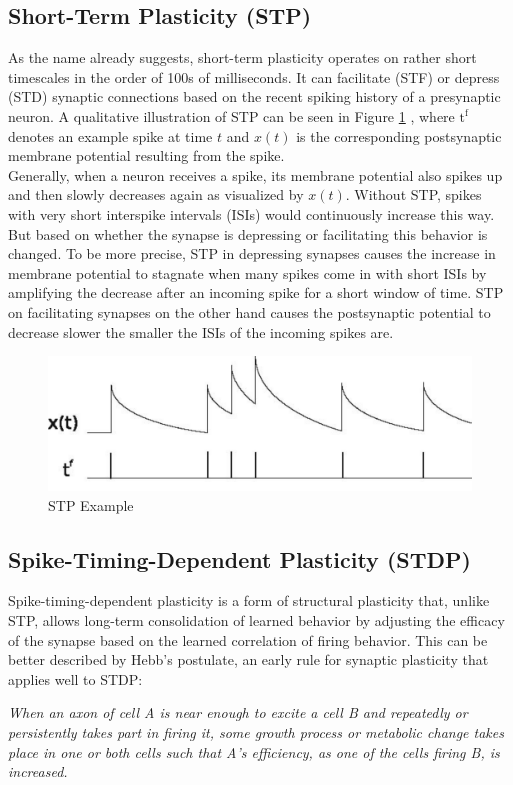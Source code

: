 \subsection{Short-Term Plasticity (STP)} \label{ssec:short_term_plasticity}
As the name already suggests, short-term plasticity operates on rather short timescales in the order of 100s of milliseconds. It can facilitate (STF) or depress (STD) synaptic connections based on the recent spiking history of a presynaptic neuron. A qualitative illustration of STP can be seen in Figure \ref{fig:stp_example} \parencite{morrison_diesmann_gerstner_2008}, where $\text{t}^\text{f}$ denotes an example spike at time $t$ and $x(t)$ is the corresponding postsynaptic membrane potential resulting from the spike.\\
Generally, when a neuron receives a spike, its membrane potential also spikes up and then slowly decreases again as visualized by $x(t)$. Without STP, spikes with very short interspike intervals (ISIs) would continuously increase this way. But based on whether the synapse is depressing or facilitating this behavior is changed. To be more precise, STP in depressing synapses causes the increase in membrane potential to stagnate when many spikes come in with short ISIs by amplifying the decrease after an incoming spike for a short window of time. STP on facilitating synapses on the other hand causes the postsynaptic potential to decrease slower the smaller the ISIs of the incoming spikes are.

\begin{figure}[htbp]
    \centering
    \includegraphics[width=0.9\columnwidth]{Figures/stp_example.pdf}
    \caption{STP Example \parencite{morrison_diesmann_gerstner_2008}}
    \label{fig:stp_example}
\end{figure}


\subsection{Spike-Timing-Dependent Plasticity (STDP)} \label{ssec:spike_timing_dependent_plasticity}
Spike-timing-dependent plasticity is a form of structural plasticity that, unlike STP, allows long-term consolidation of learned behavior by adjusting the efficacy of the synapse based on the learned correlation of firing behavior. This can be better described by Hebb's postulate, an early rule for synaptic plasticity that applies well to STDP:
\begin{displayquote}
\textit{When an axon of cell A is near enough to excite a cell B and repeatedly or persistently takes part in firing it, some growth process or metabolic change takes place in one or both cells such that A’s efficiency, as one of the cells firing B, is increased.}
\end{displayquote}


